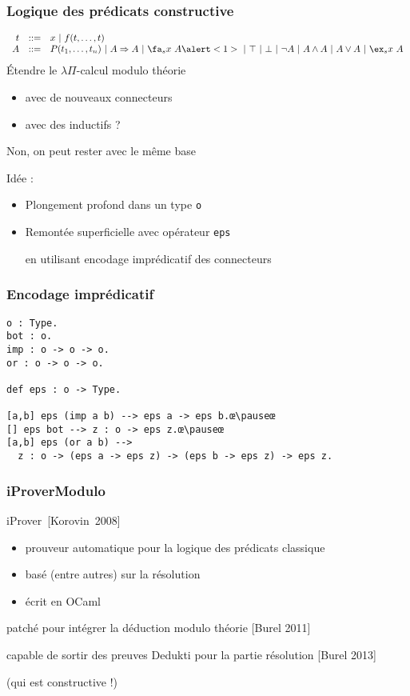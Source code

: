 \documentclass[12pt,aspectratio=169]{beamer}
\newcommand\lst[1]{{\lstinline{#1}}}
\begin{document}
\begin{frame}[fragile]
  \frametitle{Logique des prédicats constructive}
 $$
  \begin{array}{r@{~~~::=~~~}l}
    t & x~|~f(t,\ldots,t)\\
  A&P(t_1, \ldots, t_n)~|~A \Rightarrow
  A~|~\fa_s x~A\alert<1>{~|~\top~|~\bot~|~\neg A~|~A \wedge A~|~A \vee A~|~\ex_s x~A}
  \end{array}
  $$
  \pause
  Étendre le $\lambda\Pi$-calcul modulo théorie
  \begin{itemize}
  \item avec de nouveaux connecteurs
    \item avec des inductifs ?\pause
  \end{itemize}
  Non, on peut rester avec le même base
  \bigskip
  
  Idée :
  \begin{itemize}
  \item Plongement profond dans un type \lst{o}
  \item Remontée superficielle avec opérateur \lst{eps}

    en utilisant encodage imprédicatif des connecteurs
  \end{itemize}
\end{frame}

\begin{frame}[fragile]
  \frametitle{Encodage imprédicatif}
\begin{lstlisting}
o : Type.
bot : o.
imp : o -> o -> o.
or : o -> o -> o.

def eps : o -> Type.

[a,b] eps (imp a b) --> eps a -> eps b.œ\pauseœ
[] eps bot --> z : o -> eps z.œ\pauseœ
[a,b] eps (or a b) -->
  z : o -> (eps a -> eps z) -> (eps b -> eps z) -> eps z.
\end{lstlisting}


\end{frame}

\begin{frame}
\frametitle{iProverModulo}
iProver~[Korovin~2008] 
\begin{itemize}
\item prouveur automatique pour la logique des prédicats classique
\item basé (entre autres) sur la résolution
\item écrit en OCaml
\end{itemize}
\medskip

patché pour intégrer la déduction modulo théorie [Burel 2011]
\medskip

capable de sortir des preuves Dedukti pour la partie résolution [Burel 2013]

(qui est constructive !)
\end{frame}
\end{document}
